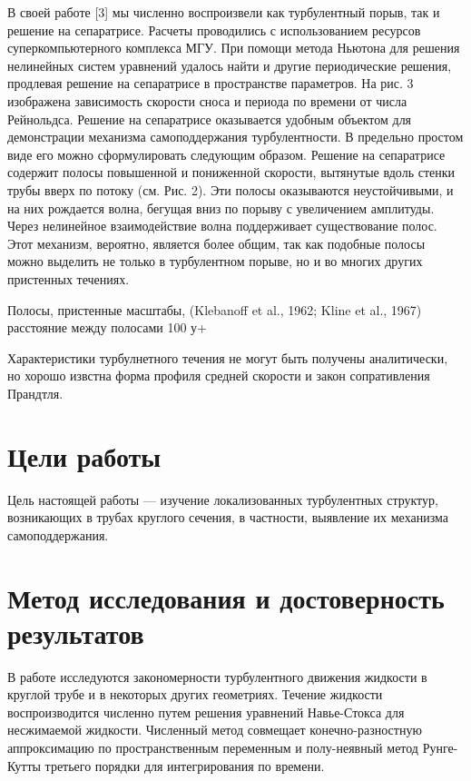 В своей работе [3] мы численно воспроизвели как турбулентный порыв, так и решение на сепаратрисе. Расчеты проводились с использованием ресурсов суперкомпьютерного комплекса МГУ. При помощи метода Ньютона для решения нелинейных систем уравнений удалось найти и другие периодические решения, продлевая решение на сепаратрисе в пространстве параметров. На рис. 3 изображена зависимость скорости сноса и периода по времени от числа Рейнольдса. Решение на сепаратрисе оказывается удобным объектом для демонстрации механизма самоподдержания турбулентности. В предельно простом виде его можно сформулировать следующим образом. Решение на сепаратрисе содержит полосы повышенной и пониженной скорости, вытянутые вдоль стенки трубы вверх по потоку (см. Рис. 2). Эти полосы оказываются неустойчивыми, и на них рождается волна, бегущая вниз по порыву с увеличением амплитуды. Через нелинейное взаимодействие волна поддерживает существование полос. Этот механизм, вероятно, является более общим, так как подобные полосы можно выделить не только в турбулентном порыве, но и во многих других пристенных течениях.

Полосы, пристенные масштабы, (Klebanoff et al., 1962; Kline et al., 1967) расстояние между полосами 100 у+

Характеристики турбулнетного течения не могут быть получены аналитически, но хорошо извстна форма профиля средней скорости и закон сопративления Прандтля. 

\section{Цели работы}

Цель настоящей работы --- изучение локализованных турбулентных структур, возникающих в трубах круглого сечения, в частности, выявление их механизма самоподдержания. 

\section{Метод исследования и достоверность результатов}

В работе исследуются закономерности турбулентного движения жидкости в круглой трубе и в некоторых других геометриях. Течение жидкости воспроизводится численно путем решения уравнений Навье-Стокса для несжимаемой жидкости. Численный метод совмещает конечно-разностную аппроксимацию по пространственным переменным и полу-неявный метод Рунге-Кутты третьего порядки для интегрирования по времени. 


